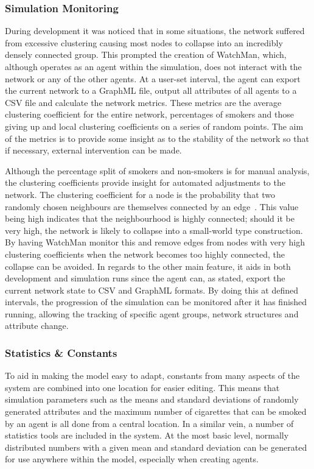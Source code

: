 \documentclass[]{report}
\begin{document}
\subsubsection{Simulation Monitoring}
During development it was noticed that in some situations, the network suffered from excessive clustering causing most nodes to collapse into an incredibly densely connected group. This prompted the creation of WatchMan, which, although operates as an agent within the simulation, does not interact with the network or any of the other agents. At a user-set interval, the agent can export the current network to a GraphML file, output all attributes of all agents to a CSV file and calculate the network metrics. These metrics are the average clustering coefficient for the entire network, percentages of smokers and those giving up and local clustering coefficients on a series of random points. The aim of the metrics is to provide some insight as to the stability of the network so that if necessary, external intervention can be made.

Although the percentage split of smokers and non-smokers is for manual analysis, the clustering coefficients provide insight for automated adjustments to the network. The clustering coefficient for a node is the probability that two randomly chosen neighbours are themselves connected by an edge~\cite{NetMark-44-cluster}. This value being high indicates that the neighbourhood is highly connected; should it be very high, the network is likely to collapse into a small-world type construction. By having WatchMan monitor this and remove edges from nodes with very high clustering coefficients when the network becomes too highly connected, the collapse can be avoided. In regards to the other main feature, it aids in both development and simulation runs since the agent can, as stated, export the current network state to CSV and GraphML formats. By doing this at defined intervals, the progression of the simulation can be monitored after it has finished running, allowing the tracking of specific agent groups, network structures and attribute change. 

\subsubsection{Statistics \& Constants}
To aid in making the model easy to adapt, constants from many aspects of the system are combined into one location for easier editing. This means that simulation parameters such as the means and standard deviations of randomly generated attributes and the maximum number of cigarettes that can be smoked by an agent is all done from a central location. In a similar vein, a number of statistics tools are included in the system. At the most basic level, normally distributed numbers with a given mean and standard deviation can be generated for use anywhere within the model, especially when creating agents.
\end{document}
